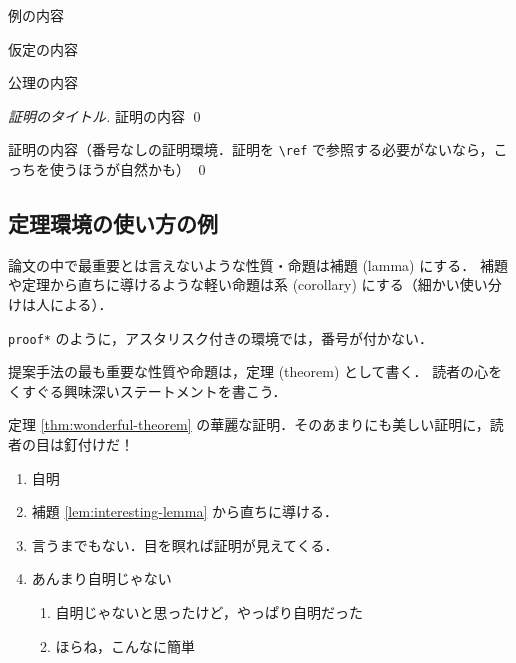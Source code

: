 \documentclass[sharedthmnum]{sumiilab-paper}
\begin{document}
\begin{example}[例のタイトル]
  例の内容
\end{example}

\begin{assumption}[仮定のタイトル]
  仮定の内容
\end{assumption}

\begin{axiom}[公理のタイトル]
  公理の内容
\end{axiom}

\begin{proof}[証明のタイトル]
  証明の内容 \qed
\end{proof}

\begin{proof*}[証明のタイトル]
  証明の内容（番号なしの証明環境．証明を \lstinline|\ref| で参照する必要がないなら，こっちを使うほうが自然かも） \qed
\end{proof*}

\subsection{定理環境の使い方の例}

\begin{lemma}
  \label{lem:interesting-lemma}
  論文の中で最重要とは言えないような性質・命題は補題 (lamma) にする．
  補題や定理から直ちに導けるような軽い命題は系 (corollary) にする（細かい使い分けは人による）．
\end{lemma}

\begin{proof*}
  \lstinline|proof*| のように，アスタリスク付きの環境では，番号が付かない．
\end{proof*}

\begin{theorem}
  \label{thm:wonderful-theorem}
  提案手法の最も重要な性質や命題は，定理 (theorem) として書く．
  読者の心をくすぐる興味深いステートメントを書こう．
\end{theorem}

\begin{proof*}
  定理 \ref{thm:wonderful-theorem} の華麗な証明．そのあまりにも美しい証明に，読者の目は釘付けだ！
  \begin{enumerate}[leftmargin=0pt,itemindent=*,label=Case \arabic*.]
  \item 自明
  \item 補題 \ref{lem:interesting-lemma} から直ちに導ける．
  \item 言うまでもない．目を瞑れば証明が見えてくる．
  \item あんまり自明じゃない
    \begin{enumerate}[label=(\roman*)]
    \item 自明じゃないと思ったけど，やっぱり自明だった
    \item ほらね，こんなに簡単
    \end{enumerate}
  \end{enumerate}
\end{proof*}
\end{document}
